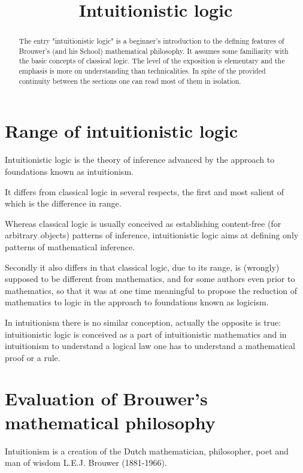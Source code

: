 \documentclass[12pt]{article}
\begin{document}
\title{Intuitionistic logic}\Large 
\maketitle

\begin{abstract}
The entry "intuitionistic logic" is a beginner's introduction to the defining features of Brouwer's (and his School) mathematical philosophy. It assumes some familiarity with the basic concepts of classical logic. The level of the exposition is elementary and the emphasis is more on understanding than technicalities. In spite of the provided continuity between the sections one can read most of them in isolation.
\end{abstract}

\tableofcontents

\section{Range of intuitionistic logic}\normalsize

Intuitionistic logic is the theory of inference advanced by the approach to foundations known as intuitionism.

It differs from classical logic in several respects, the first and most salient of which is the difference in range. 

Whereas classical logic is usually conceived as establishing content-free (for arbitrary objects) patterns of inference, intuitionistic logic aims at defining only patterns of mathematical inference.
 
Secondly it also differs in that classical logic, due to its range, is (wrongly) supposed to be different from mathematics, and for some authors even prior to mathematics, so that it was at one time meaningful to propose the reduction of mathematics to logic in the approach to foundations known as logicism.

In intuitionism there is no similar conception, actually the opposite is true: intuitionistic logic is conceived as a part of intuitionistic mathematics and in intuitionism to understand a logical law one has to understand a mathematical proof or a  rule. 

\section{Evaluation of Brouwer's mathematical philosophy}\normalsize

Intuitionism is a creation of the Dutch mathematician, philosopher, poet and man of wisdom L.E.J. Brouwer (1881-1966).
\end{document}
